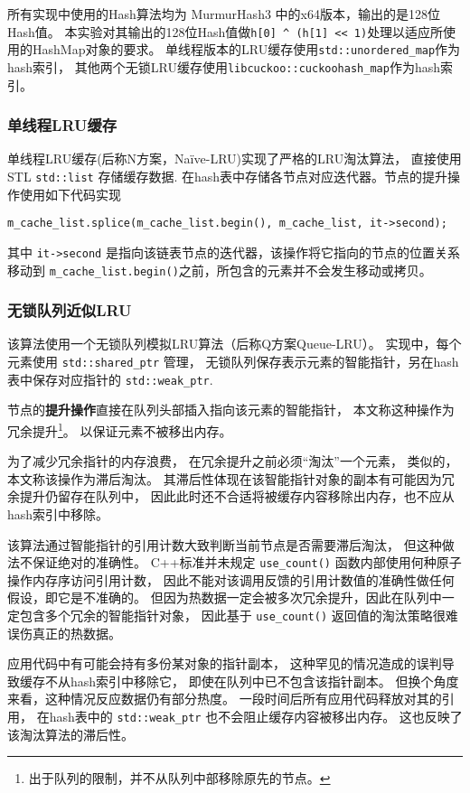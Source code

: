 所有实现中使用的Hash算法均为 MurmurHash3 中的x64版本，输出的是128位Hash值。
本实验对其输出的128位Hash值做\verb|h[0] ^ (h[1] << 1)|处理以适应所使用的HashMap对象的要求。
单线程版本的LRU缓存使用\verb|std::unordered_map|作为hash索引，
其他两个无锁LRU缓存使用\verb|libcuckoo::cuckoohash_map|作为hash索引。

\subsubsection{单线程LRU缓存}

单线程LRU缓存(后称N方案，Na\"{i}ve-LRU)实现了严格的LRU淘汰算法，
直接使用STL \verb|std::list| 存储缓存数据.
在hash表中存储各节点对应迭代器。节点的提升操作使用如下代码实现 
\begin{verbatim}
m_cache_list.splice(m_cache_list.begin(), m_cache_list, it->second);
\end{verbatim}
其中 \verb|it->second| 是指向该链表节点的迭代器，该操作将它指向的节点的位置关系移动到
\verb|m_cache_list.begin()|之前，所包含的元素并不会发生移动或拷贝。

\subsubsection{无锁队列近似LRU}

该算法使用一个无锁队列模拟LRU算法（后称Q方案Queue-LRU）。
实现中，每个元素使用 \verb|std::shared_ptr| 管理，
无锁队列保存表示元素的智能指针，另在hash表中保存对应指针的 \verb|std::weak_ptr|.

节点的\textbf{提升操作}直接在队列头部插入指向该元素的智能指针，
本文称这种操作为冗余提升\footnote{出于队列的限制，并不从队列中部移除原先的节点。}。
以保证元素不被移出内存。

为了减少冗余指针的内存浪费，
在冗余提升之前必须“淘汰”一个元素，
类似的，本文称该操作为滞后淘汰。
其滞后性体现在该智能指针对象的副本有可能因为冗余提升仍留存在队列中，
因此此时还不合适将被缓存内容移除出内存，也不应从hash索引中移除。

该算法通过智能指针的引用计数大致判断当前节点是否需要滞后淘汰，
但这种做法不保证绝对的准确性。
C++标准并未规定 \verb|use_count()| 函数内部使用何种原子操作内存序访问引用计数，
因此不能对该调用反馈的引用计数值的准确性做任何假设，即它是不准确的。
但因为热数据一定会被多次冗余提升，因此在队列中一定包含多个冗余的智能指针对象，
因此基于 \verb|use_count()| 返回值的淘汰策略很难误伤真正的热数据。

应用代码中有可能会持有多份某对象的指针副本，
这种罕见的情况造成的误判导致缓存不从hash索引中移除它，
即使在队列中已不包含该指针副本。
但换个角度来看，这种情况反应数据仍有部分热度。
一段时间后所有应用代码释放对其的引用，
在hash表中的 \verb|std::weak_ptr| 也不会阻止缓存内容被移出内存。
这也反映了该淘汰算法的滞后性。


